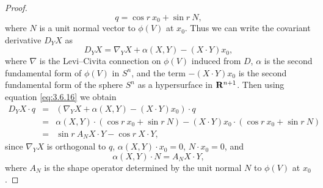 \documentclass[12pt]{article}
\begin{document}
\begin{proof}
\begin{equation}
\label{eq:3.6.16}
q = \cos r\  x_0 + \sin r\  N, 
\end{equation}
where $N$ is a unit normal vector to $\phi (V)$ at $x_0$.  Thus we can write the covariant derivative
$D_Y X$ as
\begin{equation}
\label{eq:3.6.17}
D_Y X = \nabla_Y X + \alpha (X,Y) - (X \cdot Y) x_0, 
\end{equation}
where $\nabla$ is the Levi--Civita connection on $\phi (V)$ induced from $D$, $\alpha$ is the second fundamental
form of $\phi (V)$ in $S^n$, and the term $- (X \cdot Y) x_0$ is the second fundamental
form of the sphere $S^n$ as a hypersurface in ${\bf R}^{n+1}$. 
Then using equation \eqref{eq:3.6.16} we obtain
\begin{eqnarray}
\label{eq:3.6.18}
D_Y X \cdot q &=& (\nabla_Y X + \alpha (X,Y) - (X \cdot Y) x_0) \cdot q \\
 &=& \alpha (X,Y) \cdot (\cos r\  x_0 + \sin r\  N) - (X \cdot Y) x_0 \cdot (\cos r\  x_0 + \sin r\  N) \nonumber \\
 &=& \sin r \ A_N X \cdot Y - \cos r \ X \cdot Y, \nonumber
\end{eqnarray}
since $\nabla_Y X$ is orthogonal to $q$, $\alpha (X,Y) \cdot x_0 = 0$, $N \cdot x_0 = 0$,  and 
\begin{displaymath}
\alpha (X,Y)\cdot N = A_N X \cdot Y,
\end{displaymath}
where $A_N$ is the shape operator
determined by the unit normal $N$ to $\phi (V)$ at $x_0$.


\end{proof}
\end{document}
